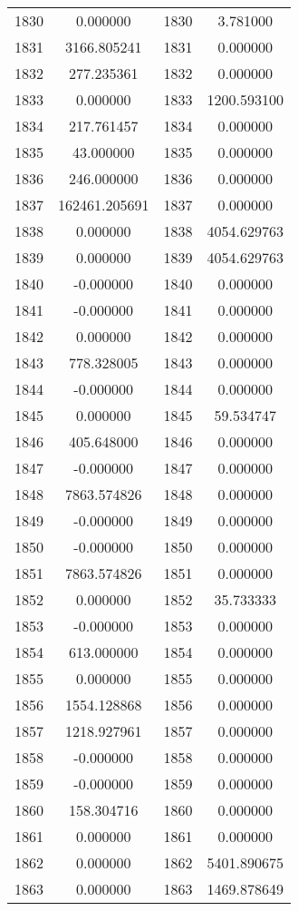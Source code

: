 \documentclass[12pt]{article}
\begin{document}
\begin{longtable}{@{}cccc@{}}
1830 & 0.000000 & 1830 & 3.781000 \\
1831 & 3166.805241 & 1831 & 0.000000 \\
1832 & 277.235361 & 1832 & 0.000000 \\
1833 & 0.000000 & 1833 & 1200.593100 \\
1834 & 217.761457 & 1834 & 0.000000 \\
1835 & 43.000000 & 1835 & 0.000000 \\
1836 & 246.000000 & 1836 & 0.000000 \\
1837 & 162461.205691 & 1837 & 0.000000 \\
1838 & 0.000000 & 1838 & 4054.629763 \\
1839 & 0.000000 & 1839 & 4054.629763 \\
1840 & -0.000000 & 1840 & 0.000000 \\
1841 & -0.000000 & 1841 & 0.000000 \\
1842 & 0.000000 & 1842 & 0.000000 \\
1843 & 778.328005 & 1843 & 0.000000 \\
1844 & -0.000000 & 1844 & 0.000000 \\
1845 & 0.000000 & 1845 & 59.534747 \\
1846 & 405.648000 & 1846 & 0.000000 \\
1847 & -0.000000 & 1847 & 0.000000 \\
1848 & 7863.574826 & 1848 & 0.000000 \\
1849 & -0.000000 & 1849 & 0.000000 \\
1850 & -0.000000 & 1850 & 0.000000 \\
1851 & 7863.574826 & 1851 & 0.000000 \\
1852 & 0.000000 & 1852 & 35.733333 \\
1853 & -0.000000 & 1853 & 0.000000 \\
1854 & 613.000000 & 1854 & 0.000000 \\
1855 & 0.000000 & 1855 & 0.000000 \\
1856 & 1554.128868 & 1856 & 0.000000 \\
1857 & 1218.927961 & 1857 & 0.000000 \\
1858 & -0.000000 & 1858 & 0.000000 \\
1859 & -0.000000 & 1859 & 0.000000 \\
1860 & 158.304716 & 1860 & 0.000000 \\
1861 & 0.000000 & 1861 & 0.000000 \\
1862 & 0.000000 & 1862 & 5401.890675 \\
1863 & 0.000000 & 1863 & 1469.878649 \\

\end{longtable}
\end{document}

